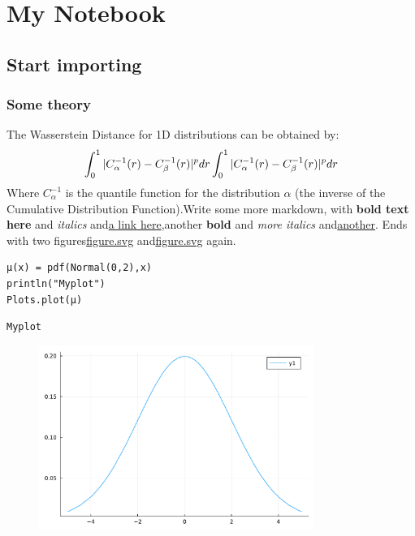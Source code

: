 \newpage

\chapter{My Notebook}

\section{Start importing}

\subsection{Some theory}
The Wasserstein Distance for 1D distributions can be obtained by:
\begin{displaymath}
	\int_0^1 |C_\alpha^{-1}(r) - C_\beta^{-1}(r)|^p dr \\
	\int_0^1 |C_\alpha^{-1}(r) - C_\beta^{-1}(r)|^p dr
\end{displaymath}
Where $C_\alpha^{-1}$ is the quantile function for the distribution $\alpha$ (the inverse of the Cumulative Distribution Function).Write some more markdown, with \textbf{bold text here} and \textit{italics} and\href{https://juliaoptimaltransport.github.io/OptimalTransport.jl/stable/examples/basic/}{a link here},another \textbf{bold} and \textit{more italics} and\href{https://github.com/}{another}. Ends with two figures\href{Figure}{figure.svg} and\href{Figure 2}{figure.svg} again.
\begin{lstlisting}[language=JuliaLocal, style=julia]
μ(x) = pdf(Normal(0,2),x)
println("Myplot")
Plots.plot(μ)
\end{lstlisting}

\begin{verbatim}
Myplot

\end{verbatim}

\begin{figure}[H]
	\centering
	\includegraphics[width=0.8\textwidth]{./figures/jupyternotebook_figure1.pdf}
	\label{fig:jupyternotebook_figure1}

\end{figure}


